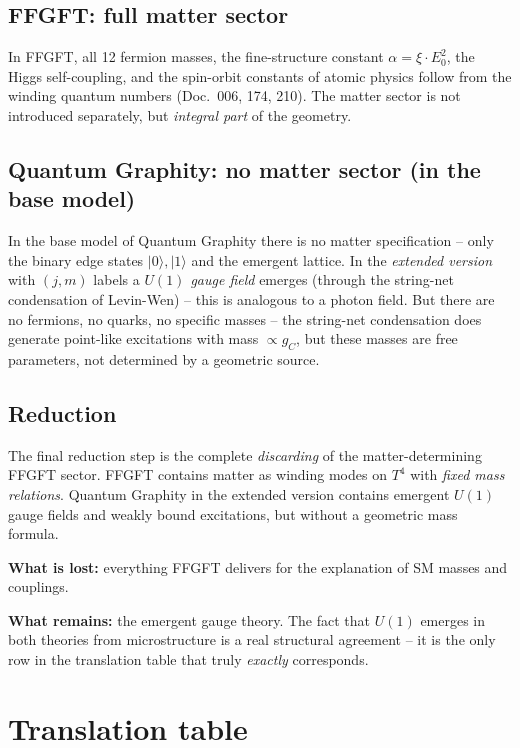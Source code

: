 \subsection{FFGFT: full matter sector}

In FFGFT, all 12 fermion masses, the fine-structure constant
$\alpha = \xi \cdot E_0^2$, the Higgs self-coupling, and the
spin-orbit constants of atomic physics follow from the winding
quantum numbers (Doc.~006, 174, 210). The matter sector is not
introduced separately, but \emph{integral part} of the geometry.

\subsection{Quantum Graphity: no matter sector (in the base model)}

In the base model of Quantum Graphity there is no matter
specification -- only the binary edge states $|0\rangle, |1\rangle$
and the emergent lattice. In the \emph{extended version} with
$(j, m)$ labels a \emph{$U(1)$ gauge field} emerges (through the
string-net condensation of Levin-Wen) -- this is analogous to a
photon field. But there are no fermions, no quarks, no specific
masses -- the string-net condensation does generate point-like
excitations with mass $\propto g_C$, but these masses are free
parameters, not determined by a geometric source.

\subsection{Reduction}

The final reduction step is the complete \emph{discarding} of the
matter-determining FFGFT sector. FFGFT contains matter as winding
modes on $T^4$ with \emph{fixed mass relations}. Quantum Graphity
in the extended version contains emergent $U(1)$ gauge fields and
weakly bound excitations, but without a geometric mass formula.

\textbf{What is lost:} everything FFGFT delivers for the explanation
of SM masses and couplings.

\textbf{What remains:} the emergent gauge theory. The fact that
$U(1)$ emerges in both theories from microstructure is a real
structural agreement -- it is the only row in the translation
table that truly \emph{exactly} corresponds.

\section{Translation table}

